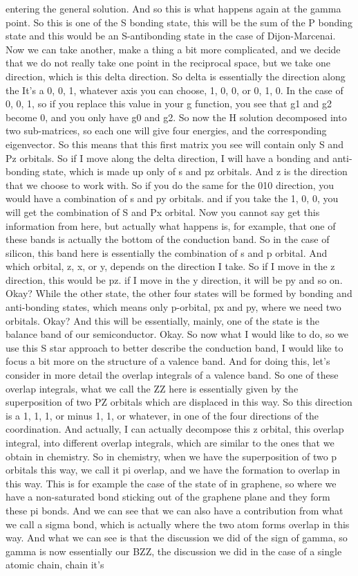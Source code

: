 entering the general solution. And so this is what happens again at the gamma point. So this is one of the S bonding state, this will be the sum of the P bonding state and this would be an S-antibonding state in the case of Dijon-Marcenai.
Now we can take another, make a thing a bit more complicated, and we decide that we do not really take one point in the reciprocal space, but we take one direction, which is this delta direction. So delta is essentially the direction along the It's a 0, 0, 1, whatever axis you can choose, 1, 0, 0, or 0, 1, 0. In the case of 0, 0, 1, so if you replace this value in your g function, you see that g1 and g2 become 0, and you only have g0 and g2. So now the H solution decomposed into two sub-matrices, so each one will give four energies, and the corresponding eigenvector. So this means that this first matrix you see will contain only S and Pz orbitals. So if I move along the delta direction, I will have a bonding and anti-bonding state, which is made up only of s and pz orbitals. And z is the direction that we choose to work with. So if you do the same for the 010 direction, you would have a combination of s and py orbitals. and if you take the 1, 0, 0, you will get the combination of S and Px orbital. Now you cannot say get this information from here, but actually what happens is, for example, that one of these bands is actually the bottom of the conduction band. So in the case of silicon, this band here is essentially the combination of s and p orbital. And which orbital, z, x, or y, depends on the direction I take. So if I move in the z direction, this would be pz. if I move in the y direction, it will be py and so on. Okay? While the other state, the other four states will be formed by bonding and anti-bonding states, which means only p-orbital, px and py, where we need two orbitals. Okay? And this will be essentially, mainly, one of the state is the balance band of our semiconductor. Okay. So now what I would like to do, so we use this S star approach to better describe the conduction band, I would like to focus a bit more on the structure of a valence band. And for doing this, let's consider in more detail the overlap integrals of a valence band. So one of these overlap integrals, what we call the ZZ here is essentially given by the superposition of two PZ orbitals which are displaced in this way. So this direction is a 1, 1, 1, or minus 1, 1, or whatever, in one of the four directions of the coordination. And actually, I can actually decompose this z orbital, this overlap integral, into different overlap integrals, which are similar to the ones that we obtain in chemistry. So in chemistry, when we have the superposition of two p orbitals this way, we call it pi overlap, and we have the formation to overlap in this way. This is for example the case of the state of in graphene, so where we have a non-saturated bond sticking out of the graphene plane and they form these pi bonds. And we can see that we can also have a contribution from what we call a sigma bond, which is actually where the two atom forms overlap in this way. And what we can see is that the discussion we did of the sign of gamma, so gamma is now essentially our BZZ, the discussion we did in the case of a single atomic chain, chain it's 